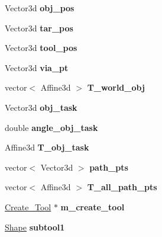 \begin{DoxyCompactItemize}
Vector3d {\bfseries obj\+\_\+pos}
\item 
\mbox{\label{classTool__Expt_ac661b0f3c0cde863b049080acb650cac}} 
Vector3d {\bfseries tar\+\_\+pos}
\item 
\mbox{\label{classTool__Expt_a2b9adb9f74761aa9be40e89c67389559}} 
Vector3d {\bfseries tool\+\_\+pos}
\item 
\mbox{\label{classTool__Expt_af98857e25cd839ab9887746793655d47}} 
Vector3d {\bfseries via\+\_\+pt}
\item 
\mbox{\label{classTool__Expt_a5deefee78883611c3317d92b7cfe63ea}} 
vector$<$ Affine3d $>$ {\bfseries T\+\_\+world\+\_\+obj}
\item 
\mbox{\label{classTool__Expt_a1e489a80d56cae13e9bde5c7066d6dbc}} 
Vector3d {\bfseries obj\+\_\+task}
\item 
\mbox{\label{classTool__Expt_a634418684086eb5bac9009cfc1da11d7}} 
double {\bfseries angle\+\_\+obj\+\_\+task}
\item 
\mbox{\label{classTool__Expt_aaf040fdacac27ee03360d04dab647077}} 
Affine3d {\bfseries T\+\_\+obj\+\_\+task}
\item 
\mbox{\label{classTool__Expt_a71ce08c1a0a9f5dd4ed7ee5b9d070d1b}} 
vector$<$ Vector3d $>$ {\bfseries path\+\_\+pts}
\item 
\mbox{\label{classTool__Expt_a10152fd0b955160cbf82bd464a8dba22}} 
vector$<$ Affine3d $>$ {\bfseries T\+\_\+all\+\_\+path\+\_\+pts}
\item 
\mbox{\label{classTool__Expt_a480f0bd09995c739a0df8e13fa8a49c4}} 
\hyperlink{classCreate__Tool}{Create\+\_\+\+Tool} $\ast$ {\bfseries m\+\_\+create\+\_\+tool}
\item 
\mbox{\label{classTool__Expt_a6e42a261327a333699868cd3b0e8725d}} 
\hyperlink{structShape}{Shape} {\bfseries subtool1}
\item 
\mbox{\label{classTool__Expt_a6f6bfc3e326723d029e8f14f8a6da403}} 

\end{DoxyCompactItemize}
